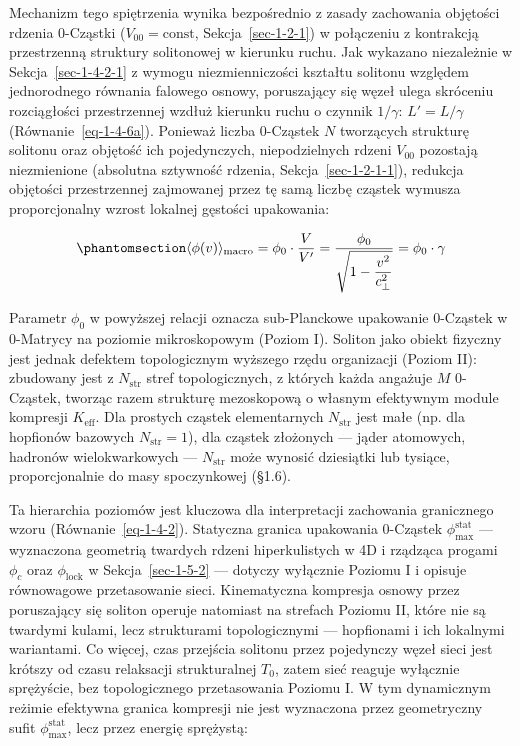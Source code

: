 \documentclass[
  polish,
  letterpaper,
  DIV=11,
  numbers=noendperiod,
  oneside]{scrartcl}
\begin{document}
Mechanizm tego spiętrzenia wynika bezpośrednio z zasady zachowania
objętości rdzenia 0-Cząstki (\(V_{00}=\text{const}\),
Sekcja~\ref{sec-1-2-1}) w połączeniu z kontrakcją przestrzenną struktury
solitonowej w kierunku ruchu. Jak wykazano niezależnie w
Sekcja~\ref{sec-1-4-2-1} z wymogu niezmienniczości kształtu solitonu
względem jednorodnego równania falowego osnowy, poruszający się węzeł
ulega skróceniu rozciągłości przestrzennej wzdłuż kierunku ruchu o
czynnik \(1/\gamma\): \(L'=L/\gamma\) (Równanie~\ref{eq-1-4-6a}).
Ponieważ liczba 0-Cząstek \(N\) tworzących strukturę solitonu oraz
objętość ich pojedynczych, niepodzielnych rdzeni \(V_{00}\) pozostają
niezmienione (absolutna sztywność rdzenia, Sekcja~\ref{sec-1-2-1-1}),
redukcja objętości przestrzennej zajmowanej przez tę samą liczbę cząstek
wymusza proporcjonalny wzrost lokalnej gęstości upakowania:

\begin{equation}\protect\phantomsection\label{eq-1-4-2}{\langle\phi(v)\rangle_{\text{macro}} = \phi_0\cdot\frac{V}{V'} = \frac{\phi_0}{\sqrt{1 - \dfrac{v^2}{c_{\perp}^2}}} = \phi_0\cdot\gamma}\end{equation}

Parametr \(\phi_0\) w powyższej relacji oznacza sub-Planckowe upakowanie
0-Cząstek w 0-Matrycy na poziomie mikroskopowym (Poziom I). Soliton jako
obiekt fizyczny jest jednak defektem topologicznym wyższego rzędu
organizacji (Poziom II): zbudowany jest z \(N_\text{str}\) stref
topologicznych, z których każda angażuje \(M\) 0-Cząstek, tworząc razem
strukturę mezoskopową o własnym efektywnym module kompresji
\(K_\text{eff}\). Dla prostych cząstek elementarnych \(N_\text{str}\)
jest małe (np. dla hopfionów bazowych \(N_\text{str}=1\)), dla cząstek
złożonych --- jąder atomowych, hadronów wielokwarkowych ---
\(N_\text{str}\) może wynosić dziesiątki lub tysiące, proporcjonalnie do
masy spoczynkowej (§1.6).

Ta hierarchia poziomów jest kluczowa dla interpretacji zachowania
granicznego wzoru (Równanie~\ref{eq-1-4-2}). Statyczna granica
upakowania 0-Cząstek \(\phi_\text{max}^\text{stat}\) --- wyznaczona
geometrią twardych rdzeni hiperkulistych w 4D i rządząca progami
\(\phi_c\) oraz \(\phi_\text{lock}\) w Sekcja~\ref{sec-1-5-2} ---
dotyczy wyłącznie Poziomu I i opisuje równowagowe przetasowanie sieci.
Kinematyczna kompresja osnowy przez poruszający się soliton operuje
natomiast na strefach Poziomu II, które nie są twardymi kulami, lecz
strukturami topologicznymi --- hopfionami i ich lokalnymi wariantami. Co
więcej, czas przejścia solitonu przez pojedynczy węzeł sieci jest
krótszy od czasu relaksacji strukturalnej \(T_0\), zatem sieć reaguje
wyłącznie sprężyście, bez topologicznego przetasowania Poziomu I. W tym
dynamicznym reżimie efektywna granica kompresji nie jest wyznaczona
przez geometryczny sufit \(\phi_\text{max}^\text{stat}\), lecz przez
energię sprężystą:
\end{document}
